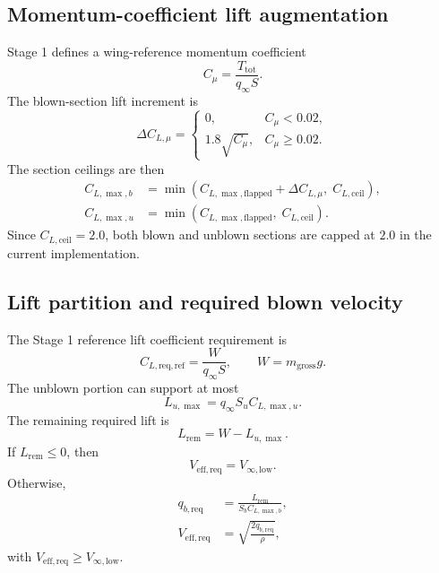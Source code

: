 \documentclass[11pt]{article}
\begin{document}
\subsection{Momentum-coefficient lift augmentation}

Stage 1 defines a wing-reference momentum coefficient
\begin{equation}
C_\mu = \frac{T_{\mathrm{tot}}}{q_\infty S}.
\end{equation}
The blown-section lift increment is
\begin{equation}
\Delta C_{L,\mu} =
\begin{cases}
0, & C_\mu < 0.02, \\
1.8 \sqrt{C_\mu}, & C_\mu \ge 0.02.
\end{cases}
\end{equation}
The section ceilings are then
\begin{align}
C_{L,\max,b} &= \min\left(C_{L,\max,\mathrm{flapped}} + \Delta C_{L,\mu},\; C_{L,\mathrm{ceil}}\right), \\
C_{L,\max,u} &= \min\left(C_{L,\max,\mathrm{flapped}},\; C_{L,\mathrm{ceil}}\right).
\end{align}
Since \(C_{L,\mathrm{ceil}}=2.0\), both blown and unblown sections are capped at \(2.0\) in the current implementation.

\subsection{Lift partition and required blown velocity}

The Stage 1 reference lift coefficient requirement is
\begin{equation}
C_{L,\mathrm{req,ref}} = \frac{W}{q_\infty S},
\qquad
W = m_{\mathrm{gross}} g.
\end{equation}
The unblown portion can support at most
\begin{equation}
L_{u,\max} = q_\infty S_u C_{L,\max,u}.
\end{equation}
The remaining required lift is
\begin{equation}
L_{\mathrm{rem}} = W - L_{u,\max}.
\end{equation}
If \(L_{\mathrm{rem}} \le 0\), then
\begin{equation}
V_{\mathrm{eff,req}} = V_{\infty,\mathrm{low}}.
\end{equation}
Otherwise,
\begin{align}
q_{b,\mathrm{req}} &= \frac{L_{\mathrm{rem}}}{S_b C_{L,\max,b}}, \\
V_{\mathrm{eff,req}} &= \sqrt{\frac{2 q_{b,\mathrm{req}}}{\rho}},
\end{align}
with \(V_{\mathrm{eff,req}} \ge V_{\infty,\mathrm{low}}\).
\end{document}
